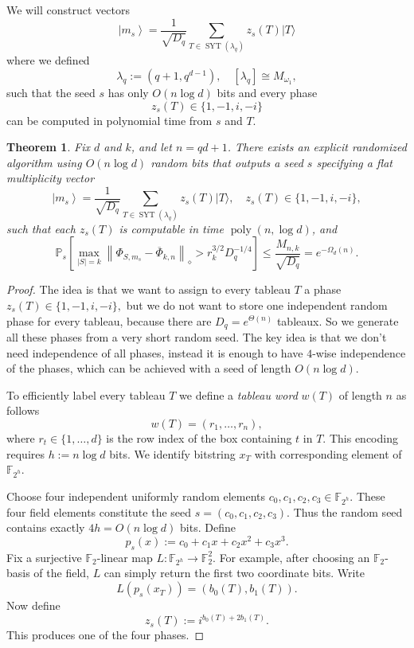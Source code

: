 \documentclass[10pt,twocolumn,superscriptaddress,aps,amsmath,amssymb,citeautoscript,floatfix,prx]{revtex4-2}
\newcounter{alg}
\theoremstyle{plain}
\theoremstyle{plain}
\theoremstyle{plain}
\theoremstyle{plain}
\theoremstyle{plain}
\theoremstyle{plain}
\theoremstyle{plain}
\newtheorem{smtheorem}{Theorem}[section]
\theoremstyle{definition}
\theoremstyle{plain}
\begin{document}
\begin{appendix}
We will construct vectors
\begin{equation}\label{eq:family_of_multiplicity_vecs}
    \left|m_s\right\rangle=\frac{1}{\sqrt{D_q}} \sum_{T \in \operatorname{SYT}\left(\lambda_q\right)} z_s(T)|T\rangle
\end{equation}
where we defined
\[
    \lambda_q:=(q+1,q^{d-1}), \quad [\lambda_q]\cong M_{\omega_1},
\]
such that the seed $s$ has only $O(n \log d)$ bits and every phase
\[
z_s(T) \in\{1,-1, i,-i\}
\]
can be computed in polynomial time from $s$ and $T$.

\begin{smtheorem}\label{thrm:randomized_multiplicity_vector}
    Fix $d$ and $k$, and let $n=q d+1$. There exists an explicit randomized algorithm using $O(n \log d)$ random bits that outputs a seed $s$ specifying a flat multiplicity vector
    $$
    \left|m_s\right\rangle=\frac{1}{\sqrt{D_q}} \sum_{T \in \operatorname{SYT}\left(\lambda_q\right)} z_s(T)|T\rangle, \quad z_s(T) \in\{1,-1, i,-i\},
    $$
    such that each $z_s(T)$ is computable in time $\operatorname{poly}(n, \log d)$, and
    \begin{equation}\label{eq:randomized_multiplicity_vector_bound}
    \mathbb{P}_s\left[\max _{|S|=k}\left\|\Phi_{S, m_s}-\overline{\Phi}_{k,n}\right\|_{\diamond}>r_k^{3 / 2} D_q^{-1 / 4}\right] \leq \frac{M_{n, k}}{\sqrt{D_q}}=e^{-\Omega_d(n)}.
    \end{equation}
\end{smtheorem}
\begin{proof}
The idea is that we want to assign to every tableau $T$ a phase
$
z_s(T) \in\{1,-1, i,-i\},
$
but we do not want to store one independent random phase for every tableau, because there are
$
D_q=e^{\Theta(n)}
$
tableaux. So we generate all these phases from a very short random seed. The key idea is that we don't need independence of all phases, 
instead it is enough to have $4$-wise independence of the phases, which can be achieved with a seed of length $O(n \log d)$.

To efficiently label every tableau $T$ we define a \textit{tableau word} $w(T)$ of length $n$ as follows
\[
    w(T)=\left(r_1, \ldots, r_n\right),
\]
where $r_t\in\{1, \ldots, d\}$ is the row index of the box containing $t$ in $T$. This encoding requires $h:=n \log d$ bits.
We identify bitstring $x_T$ with corresponding element of $\mathbb{F}_{2^h}$.

Choose four independent uniformly random elements
$
c_0, c_1, c_2, c_3 \in \mathbb{F}_{2^h} .
$
These four field elements constitute the seed
$
s=\left(c_0, c_1, c_2, c_3\right) .
$
Thus the random seed contains exactly
$
4 h=O(n \log d)
$
bits.
Define
$$
p_s(x):=c_0+c_1 x+c_2 x^2+c_3 x^3 .
$$
Fix a surjective $\mathbb{F}_2$-linear map
$
L: \mathbb{F}_{2^h} \longrightarrow \mathbb{F}_2^2 .
$
For example, after choosing an $\mathbb{F}_2$-basis of the field, $L$ can simply return the first two coordinate bits.
Write
$$
L\left(p_s\left(x_T\right)\right)=\left(b_0(T), b_1(T)\right) .
$$
Now define
$$
z_s(T):=i^{b_0(T)+2 b_1(T)} .
$$
This produces one of the four phases. 


\end{proof}
\end{appendix}
\end{document}
